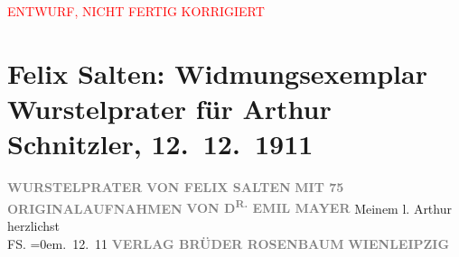 
\begin{center}
            \textcolor{red}{ENTWURF, NICHT FERTIG KORRIGIERT}
                      \end{center}
            
         
         \renewcommand{\erwaehntePersonen}{Personen: Emil Mayer}
         \renewcommand{\erwaehnteInstitutionen}{Institutionen: Verlagsanstalt Brüder Rosenbaum}
         \renewcommand{\erwaehnteOrte}{Orte: Leipzig, Wien}
         \renewcommand{\erwaehnteWerke}{Werke: Wurstelprater}
               \section[Felix Salten: Widmungsexemplar Wurstelprater für Arthur Schnitzler, 12. 12. 1911]{ Felix Salten: Widmungsexemplar Wurstelprater für Arthur Schnitzler,
               12. 12. 1911}\nopagebreak{}\rehead{ }\begin{ledgroupsized}[t]{13cm}\normalsize\beginnumbering \toendnotes[C]{\smallbreak\pagebreak[2]} 
\pstart
           \noindent{}\centering{}{\pb}\textcolor{gray}{\textbf{WURSTELPRATER}}\pend
           \pstart
           \noindent{}\centering{}\textcolor{gray}{\textbf{VON FELIX SALTEN}}\pend
           \pstart
           \noindent{}\centering{}\textcolor{gray}{\textbf{MIT 75 ORIGINALAUFNAHMEN}}\pend
           \pstart
           \noindent{}\centering{}\textcolor{gray}{\textbf{VON D\textsuperscript{R.}{ }EMIL MAYER}}\pend
           \pstart
           \noindent{} Meinem l. Arthur\pend
           \pstart
           herzlichst{\\[\baselineskip]}\spacefill\mbox{FS.}\pend
           \leftskip=0em{}. 12. 11\pend
           {\bigskip}\pstart
           \noindent{}\centering{}\textcolor{gray}{\textbf{VERLAG BRÜDER ROSENBAUM}}\pend
           \pstart
           \noindent{}\textcolor{gray}{\textbf{WIEN}}\hfill \textcolor{gray}{\textbf{LEIPZIG}}\pend
           
         
         \endnumbering{}\end{ledgroupsized}\begin{anhang}\end{anhang}\newcommand{\dateiname}{L03052}\newcommand{\titel}{Felix Salten: Widmungsexemplar Wurstelprater für Arthur Schnitzler, 12. 12. 1911}\newcommand{\editorInnen}{Martin Anton Müller und Laura Untner}
      